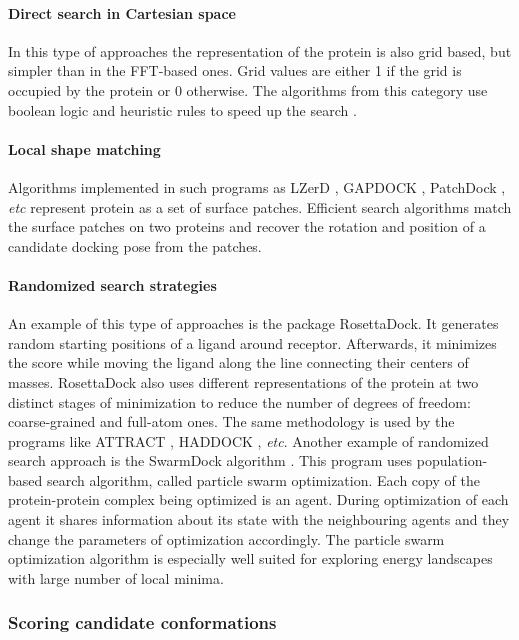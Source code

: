 \paragraph{Direct search in Cartesian space}
In this type of approaches the representation of the protein is also grid based, but simpler than in the FFT-based ones. 
Grid values are either 1 if the grid is occupied by the protein or 0 otherwise.
The algorithms from this category use boolean logic and heuristic rules to speed up the search \cite{jiang1991soft, terashi2007ske}.

\paragraph{Local shape matching}
Algorithms implemented in such programs as LZerD \cite{venkatraman2009protein}, GAPDOCK \cite{gardiner2001protein}, PatchDock \cite{duhovny2002efficient}, \emph{etc} 
represent protein as a set of surface patches. 
Efficient search algorithms match the surface patches on two proteins and recover the rotation and position of a candidate docking pose from the patches.

\paragraph{Randomized search strategies}
An example of this type of approaches is the package RosettaDock\cite{gray2003protein}. It generates random starting positions of a ligand around receptor. Afterwards,
it minimizes the score while moving the ligand along the line connecting their centers of masses. RosettaDock also uses different representations
of the protein at two distinct stages of minimization to reduce the number of degrees of freedom: coarse-grained and full-atom ones. The same methodology is used by the 
programs like ATTRACT \cite{zacharias2003protein}, HADDOCK \cite{dominguez2003haddock}, \emph{etc}. Another example of randomized search approach is the SwarmDock algorithm \cite{li2010detection}.
This program uses population-based search algorithm, called particle swarm optimization. Each copy of the protein-protein complex being optimized
is an agent. During optimization of each agent it shares information about its state with the neighbouring agents and they change the parameters of optimization accordingly. The 
particle swarm optimization algorithm is especially well suited for exploring energy landscapes with large number of local minima.

\subsubsection{Scoring candidate conformations}

